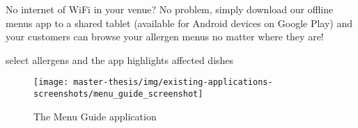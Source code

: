   No internet of WiFi in your venue? No problem, simply download our offline menus app to a shared tablet (available for Android devices on Google Play) and your customers can browse your allergen menus no matter where they are!

  select allergens and the app highlights affected dishes

  \begin{figure}[h]
    \centering
    \texttt{[image: master-thesis/img/existing-applications-screenshots/menu\_guide\_screenshot]}
    \caption{The Menu Guide application}
  \end{figure}


